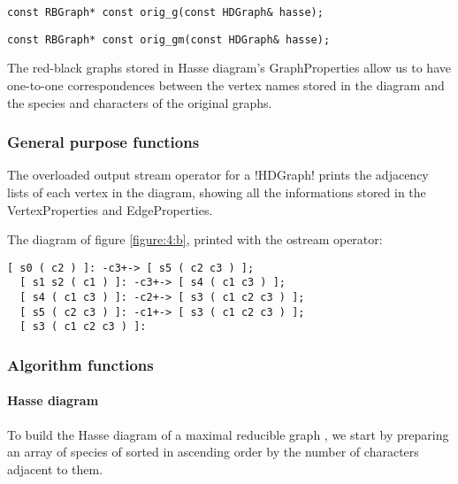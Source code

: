 \begin{lstlisting}[belowskip=0pt, moreemph={RBGraph, HDGraph},
                   moreemph={[2]orig_g}]
  const RBGraph* const orig_g(const HDGraph& hasse);
\end{lstlisting}

\begin{lstlisting}[aboveskip=\smallskipamount, moreemph={RBGraph, HDGraph},
                   moreemph={[2]orig_gm}]
  const RBGraph* const orig_gm(const HDGraph& hasse);
\end{lstlisting}

The red-black graphs stored in Hasse diagram's GraphProperties allow us to have one-to-one correspondences between the vertex names stored in the diagram and the species and characters of the original graphs.

\subsubsection*{General purpose functions}

The overloaded output stream operator for a !HDGraph! prints the adjacency lists of each vertex in the diagram, showing all the informations stored in the VertexProperties and EdgeProperties.

The diagram of figure \ref{figure:4:b}, printed with the ostream operator:

\begin{lstlisting}[belowskip=0pt, keywordstyle=\color{block_fg}]
  [ s0 ( c2 ) ]: -c3+-> [ s5 ( c2 c3 ) ];
  [ s1 s2 ( c1 ) ]: -c3+-> [ s4 ( c1 c3 ) ];
  [ s4 ( c1 c3 ) ]: -c2+-> [ s3 ( c1 c2 c3 ) ];
  [ s5 ( c2 c3 ) ]: -c1+-> [ s3 ( c1 c2 c3 ) ];
  [ s3 ( c1 c2 c3 ) ]:
\end{lstlisting}

\subsubsection*{Algorithm functions}


\paragraph{Hasse diagram}

To build the Hasse diagram of a maximal reducible graph \gm{}, we start by preparing an array of species of \gm{} sorted in ascending order by the number of characters adjacent to them.

